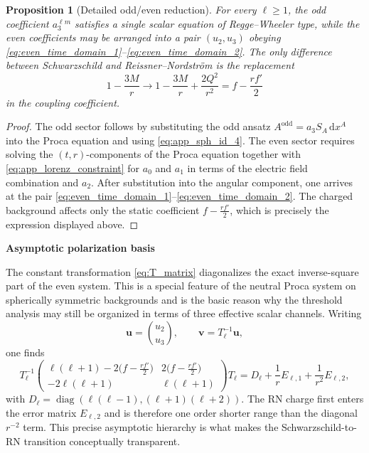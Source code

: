 \documentclass[12pt]{article}
\numberwithin{equation}{section}
\theoremstyle{plain}
\newtheorem{proposition}[theorem]{Proposition}
\theoremstyle{definition}
\theoremstyle{remark}
\newcommand{\dd}{\mathrm d}
\newcommand{\diag}{\operatorname{diag}}
\newcommand{\appheading}[1]{\par\medskip\noindent\textbf{#1}\par\smallskip\noindent}
\begin{document}
\begin{proposition}[Detailed odd/even reduction]\label{prop:app_detailed_reduction}
For every $\ell\ge1$, the odd coefficient $a_3^{\ell m}$ satisfies a single scalar equation of Regge--Wheeler type, while the even coefficients may be arranged into a pair $(u_2,u_3)$ obeying \eqref{eq:even_time_domain_1}--\eqref{eq:even_time_domain_2}.  The only difference between Schwarzschild and Reissner--Nordstr\"om is the replacement
\[
   1-\frac{3M}{r}
   \longrightarrow
   1-\frac{3M}{r}+\frac{2Q^2}{r^2}
   =
   f-\frac{rf'}{2}
\]
in the coupling coefficient.
\end{proposition}

\begin{proof}
The odd sector follows by substituting the odd ansatz $A^{\mathrm{odd}}=a_3S_A\,\dd x^A$ into the Proca equation and using \eqref{eq:app_sph_id_4}.  The even sector requires solving the $(t,r)$-components of the Proca equation together with \eqref{eq:app_lorenz_constraint} for $a_0$ and $a_1$ in terms of the electric field combination and $a_2$.  After substitution into the angular component, one arrives at the pair \eqref{eq:even_time_domain_1}--\eqref{eq:even_time_domain_2}.  The charged background affects only the static coefficient $f-\frac{rf'}{2}$, which is precisely the expression displayed above.
\end{proof}

\appheading{Asymptotic polarization basis}

The constant transformation \eqref{eq:T_matrix} diagonalizes the exact inverse-square part of the even system.  This is a special feature of the neutral Proca system on spherically symmetric backgrounds and is the basic reason why the threshold analysis may still be organized in terms of three effective scalar channels.  Writing
\[
   \bm u=\binom{u_2}{u_3},
   \qquad
   \bm v=T_\ell^{-1}\bm u,
\]
one finds
\[
   T_\ell^{-1}
   \begin{pmatrix}
      \ell(\ell+1)-2\bigl(f-\frac{rf'}2\bigr) & 2\bigl(f-\frac{rf'}2\bigr)\\
      -2\ell(\ell+1) & \ell(\ell+1)
   \end{pmatrix}
   T_\ell
   =
   D_\ell+\frac{1}{r}E_{\ell,1}+\frac{1}{r^2}E_{\ell,2},
\]
with $D_\ell=\diag(\ell(\ell-1),(\ell+1)(\ell+2))$.  The RN charge first enters the error matrix $E_{\ell,2}$ and is therefore one order shorter range than the diagonal $r^{-2}$ term.  This precise asymptotic hierarchy is what makes the Schwarzschild-to-RN transition conceptually transparent.
\end{document}
